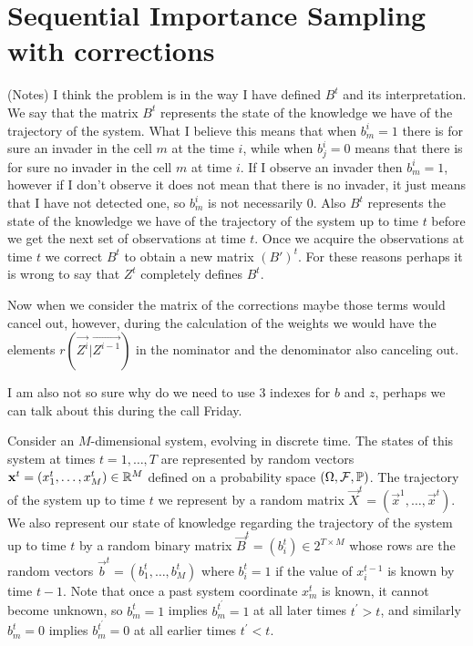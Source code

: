 \begin{abstract}
\end{abstract}



\section{Sequential Importance Sampling with corrections}
\label{sec:2}

{\color{red} (Notes) I think the problem is in the way I have defined $B^t$ and its interpretation. We say that the matrix $B^t$ represents the state of the knowledge we have of the trajectory of the system. What I believe this means that when $b^i_m = 1$ there is for sure an invader in the cell $m$ at the time $i$, while when $b^i_j = 0$ means that there is for sure no invader in the cell $m$ at time $i$. If I observe an invader then $b^i_m = 1$, however if I don't observe it does not mean that there is no invader, it just means that I have not detected one, so $b^i_m$ is not necessarily $0$. Also $B^t$ represents the state of the knowledge we have of the trajectory of the system up to time $t$ before we get the next set of observations at time $t$. Once we acquire the observations at time $t$ we correct $B^t$ to obtain a new matrix $(B')^t$. For these reasons perhaps it is wrong to say that $Z^t$ completely defines $B^t$. 

Now when we consider the matrix of the corrections maybe those terms would cancel out, however, during the calculation of the weights we would have the elements $r(\vec{Z^i} | \vec{Z^{i-1}})$ in the nominator and the denominator also canceling out.

I am also not so sure why do we need to use 3 indexes for $b$ and $z$, perhaps we can talk about this during the call Friday.}


Consider an $M$-dimensional system, evolving in discrete time. The states of this system at times $t = 1, \dots, T$ are represented by random vectors $\mathbf{x}^t = (x^t_1, \dots, x^t_M) \in \mathbb R^M$ defined on a probability space $(\Omega, \mathcal{F}, \mathbb{P})$. The trajectory of the system up to time $t$ we represent by a random matrix $\vec{X}^t = (\vec{x}^1, \ldots, \vec{x}^t)$. We also represent our state of knowledge regarding the trajectory of the system up to time $t$ by a random binary matrix $\vec{B}^t = (b^t_{i}) \in 2^{T \times M}$ whose rows are the random vectors $\vec{b}^t = (b_1^t, \dots, b_M^t)$ where $b^t_{i} = 1$ if the value of $x^{t-1}_i$ is known by time $t-1$. Note that once a past system coordinate $x^t_m$ is known, it cannot become unknown, so $b^t_m = 1$ implies $b^{t^\prime}_m = 1$ at all later times $t^{\prime} > t$, and similarly $b^t_m = 0$ implies $b^{t^{\prime}}_m = 0$ at all earlier times $t^{\prime} < t$.

